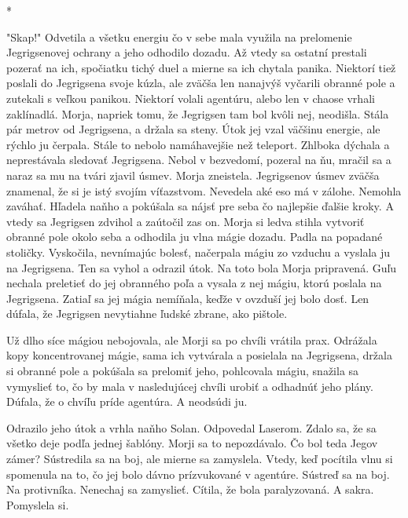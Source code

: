 \documentclass{book}
\begin{document}
\begin{center}

*

\end{center}

"$ $Skap!"$ $ Odvetila a všetku energiu čo v sebe mala využila na prelomenie Jegrigsenovej ochrany a jeho odhodilo dozadu. Až vtedy sa ostatní prestali pozerať na ich, spočiatku tichý duel a mierne sa ich chytala panika. Niektorí tiež poslali do Jegrigsena svoje kúzla, ale zväčša len nanajvýš vyčarili obranné pole a zutekali s veľkou panikou. Niektorí volali agentúru, alebo len v chaose vrhali zaklínadlá. Morja, napriek tomu, že Jegrigsen tam bol kvôli nej, neodišla. Stála pár metrov od Jegrigsena, a držala sa steny. Útok jej vzal väčšinu energie, ale rýchlo ju čerpala. Stále to nebolo namáhavejšie než teleport. Zhlboka dýchala a neprestávala sledovať Jegrigsena. Nebol v bezvedomí, pozeral na ňu, mračil sa a naraz sa mu na tvári zjavil úsmev. Morja zneistela. Jegrigsenov úsmev zväčša znamenal, že si je istý svojím víťazstvom. Nevedela aké eso má v zálohe. Nemohla zaváhať. Hľadela naňho a pokúšala sa nájsť pre seba čo najlepšie ďalšie kroky. A vtedy sa Jegrigsen zdvihol a zaútočil zas on. Morja si ledva stihla vytvoriť obranné pole okolo seba a odhodila ju vlna mágie dozadu. Padla na popadané stoličky. Vyskočila, nevnímajúc bolesť, načerpala mágiu zo vzduchu a vyslala ju na Jegrigsena. Ten sa vyhol a odrazil útok. Na toto bola Morja pripravená. Guľu nechala preletieť do jej obranného poľa a vysala z nej mágiu, ktorú poslala na Jegrigsena. Zatiaľ sa jej mágia nemíňala, keďže v ovzduší jej bolo dosť. Len dúfala, že Jegrigsen nevytiahne ľudské zbrane, ako pištole.

Už dlho síce mágiou nebojovala, ale Morji sa po chvíli vrátila prax. Odrážala kopy koncentrovanej mágie, sama ich vytvárala a posielala na Jegrigsena, držala si obranné pole a pokúšala sa prelomiť jeho, pohlcovala mágiu, snažila sa vymyslieť to, čo by mala v nasledujúcej chvíli urobiť a odhadnúť jeho plány. Dúfala, že o chvíľu príde agentúra. A neodsúdi ju.

Odrazilo jeho útok a vrhla naňho Solan. Odpovedal Laserom. Zdalo sa, že sa všetko deje podľa jednej šablóny. Morji sa to nepozdávalo. Čo bol teda Jegov zámer? Sústredila sa na boj, ale mierne sa zamyslela. Vtedy, keď pocítila vlnu si spomenula na to, čo jej bolo dávno prízvukované v agentúre. Sústreď sa na boj. Na protivníka. Nenechaj sa zamyslieť. Cítila, že bola paralyzovaná. A sakra. Pomyslela si.
\end{document}
